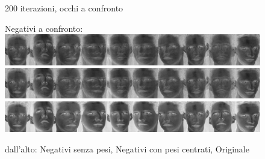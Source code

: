 \documentclass[a4paper]{article} %
\begin{document}
\begin{figure}[h]
  \caption{200 iterazioni, occhi a confronto}
\end{figure}

\begin{figure}[h]
  \centering
  Negativi a confronto:
  \subfigure
  {\includegraphics[scale=0.40]{img/negUV_noW.eps}}
  \subfigure
  {\includegraphics[scale=0.40]{img/negUV.eps}}
  \subfigure
  {\includegraphics[scale=0.40]{img/negA.eps}}
  \caption{dall'alto: Negativi senza pesi, Negativi con pesi centrati, Originale}
\end{figure}

\clearpage{} %

\end{document}
